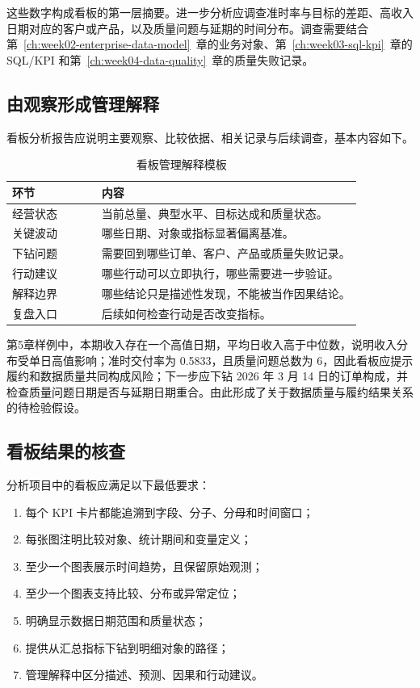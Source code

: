 这些数字构成看板的第一层摘要。进一步分析应调查准时率与目标的差距、高收入日期对应的客户或产品，以及质量问题与延期的时间分布。调查需要结合第~\ref{ch:week02-enterprise-data-model}~章的业务对象、第~\ref{ch:week03-sql-kpi}~章的 SQL/KPI 和第~\ref{ch:week04-data-quality}~章的质量失败记录。

\subsection{由观察形成管理解释}

看板分析报告应说明主要观察、比较依据、相关记录与后续调查，基本内容如下。
\begin{table}[htbp]
\centering
\caption{看板管理解释模板}
\begin{tabular}{P{0.22\linewidth}P{0.64\linewidth}}
\toprule
{}
环节 & 内容\\
\midrule

经营状态 & 当前总量、典型水平、目标达成和质量状态。\\
关键波动 & 哪些日期、对象或指标显著偏离基准。\\
下钻问题 & 需要回到哪些订单、客户、产品或质量失败记录。\\
行动建议 & 哪些行动可以立即执行，哪些需要进一步验证。\\
解释边界 & 哪些结论只是描述性发现，不能被当作因果结论。\\
复盘入口 & 后续如何检查行动是否改变指标。\\
\bottomrule
\end{tabular}
\end{table}

第5章样例中，本期收入存在一个高值日期，平均日收入高于中位数，说明收入分布受单日高值影响；准时交付率为 0.5833，且质量问题总数为 6，因此看板应提示履约和数据质量共同构成风险；下一步应下钻 2026 年 3 月 14 日的订单构成，并检查质量问题日期是否与延期日期重合。由此形成了关于数据质量与履约结果关系的待检验假设。

\subsection{看板结果的核查}

分析项目中的看板应满足以下最低要求：
\begin{enumerate}
  \item 每个 KPI 卡片都能追溯到字段、分子、分母和时间窗口；
  \item 每张图注明比较对象、统计期间和变量定义；
  \item 至少一个图表展示时间趋势，且保留原始观测；
  \item 至少一个图表支持比较、分布或异常定位；
  \item 明确显示数据日期范围和质量状态；
  \item 提供从汇总指标下钻到明细对象的路径；
  \item 管理解释中区分描述、预测、因果和行动建议。
\end{enumerate}

